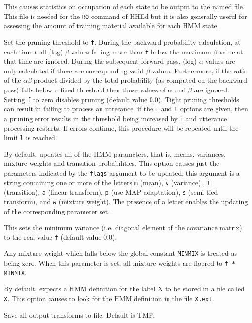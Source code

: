 \begin{optlist}
   This causes statistics on occupation of each
      state to be output to the named file.  This file
      is needed for the {\tt RO} command of HHEd but it is also
      generally useful for assessing the amount of training material
      available for each HMM state.
      
   Set the pruning threshold to {\tt f}.  During the 
      backward probability calculation, at
      each time $t$ 
      all (log) $\beta$ values falling more than {\tt f} below the
      maximum $\beta$ value at that time are ignored.  During the
      subsequent forward pass, (log) $\alpha$ values are only
      calculated if there are corresponding valid $\beta$ values.
      Furthermore, if the ratio of the $ \alpha \beta $ product divided
      by the total probability (as computed on the backward pass)
      falls below a fixed threshold then those values of $\alpha$
      and $\beta$ are ignored. Setting {\tt f} to zero disables
      pruning  (default value 0.0).  Tight pruning thresholds can
       result in  failing to process an utterance.
      if the {\tt i} and {\tt l} options are given, then a pruning
      error results in the threshold being increased by {\tt i} and
      utterance processing restarts.  If errors continue, this procedure will 
      be repeated until the limit {\tt l} is reached.
      
   By default,  updates all of the HMM parameters,
      that is, means, variances, mixture weights and 
      transition probabilities. This 
      option causes just the parameters indicated by the {\tt flags}
      argument to be updated, this argument is a string containing one
      or more of the letters {\tt m} (mean), {\tt v} (variance) ,
      {\tt t} (transition), {\tt a} (linear transform), {\tt p} (use 
	MAP adaptation), {\tt s} (semi-tied transform), and {\tt w} (mixture weight).  The 
      presence of a letter enables
      the updating of the corresponding parameter set.

    This sets the minimum variance (i.e. diagonal element of
      the covariance matrix) to the real value {\tt f} (default value
      0.0).

    Any mixture weight which falls below the global
            constant {\tt MINMIX} is treated as being zero.
      When this parameter is  set,  all mixture weights  are floored
      to {\tt f * MINMIX}.
      
    By default,  expects a HMM definition for 
      the label X to be stored in a file called {\tt X}.  This
      option causes  to look for the HMM definition in the
      file {\tt X.ext}.

   Save all output transforms to file. Default
	is TMF.

\stdoptB
\stdoptE
\stdoptF
\stdoptG
\stdoptH
\stdoptI
\stdoptJ
\stdoptK
\stdoptL
\stdoptM
\stdoptX

\end{optlist}

